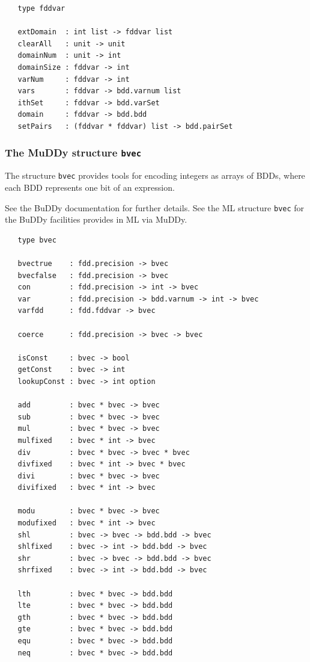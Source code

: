 \documentclass[12pt,fleqn]{book}
\renewcommand{\t}[1]{\mbox{\tt #1}}
\newcommand{\Buddy}{BuDDy{}}
\newcommand{\Muddy}{MuDDy{}}
\begin{document}
\begin{verbatim}
   type fddvar

   extDomain  : int list -> fddvar list
   clearAll   : unit -> unit
   domainNum  : unit -> int
   domainSize : fddvar -> int
   varNum     : fddvar -> int
   vars       : fddvar -> bdd.varnum list
   ithSet     : fddvar -> bdd.varSet
   domain     : fddvar -> bdd.bdd
   setPairs   : (fddvar * fddvar) list -> bdd.pairSet
\end{verbatim}

\subsubsection{The \Muddy{} structure \t{bvec}}\label{bvec}

The structure \t{bvec} provides tools for encoding integers as arrays
of BDDs, where each BDD represents one bit of an expression.

See the \Buddy{} documentation \cite{BuDDy} for further details. See the ML structure \t{bvec}
for the \Buddy{} facilities provides in ML via \Muddy{}.


\begin{verbatim}
   type bvec

   bvectrue    : fdd.precision -> bvec 
   bvecfalse   : fdd.precision -> bvec 
   con         : fdd.precision -> int -> bvec
   var         : fdd.precision -> bdd.varnum -> int -> bvec
   varfdd      : fdd.fddvar -> bvec

   coerce      : fdd.precision -> bvec -> bvec

   isConst     : bvec -> bool
   getConst    : bvec -> int
   lookupConst : bvec -> int option

   add         : bvec * bvec -> bvec
   sub         : bvec * bvec -> bvec
   mul         : bvec * bvec -> bvec
   mulfixed    : bvec * int -> bvec
   div         : bvec * bvec -> bvec * bvec
   divfixed    : bvec * int -> bvec * bvec
   divi        : bvec * bvec -> bvec
   divifixed   : bvec * int -> bvec

   modu        : bvec * bvec -> bvec
   modufixed   : bvec * int -> bvec
   shl         : bvec -> bvec -> bdd.bdd -> bvec
   shlfixed    : bvec -> int -> bdd.bdd -> bvec
   shr         : bvec -> bvec -> bdd.bdd -> bvec
   shrfixed    : bvec -> int -> bdd.bdd -> bvec

   lth         : bvec * bvec -> bdd.bdd
   lte         : bvec * bvec -> bdd.bdd
   gth         : bvec * bvec -> bdd.bdd
   gte         : bvec * bvec -> bdd.bdd
   equ         : bvec * bvec -> bdd.bdd
   neq         : bvec * bvec -> bdd.bdd
\end{verbatim}
\end{document}
